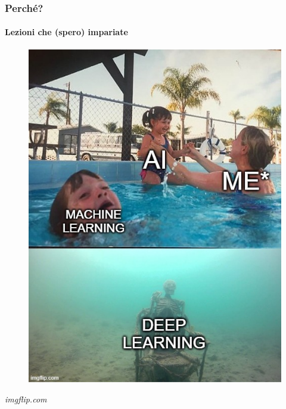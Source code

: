 \begin{frame}[t,fragile] \frametitle{Perché?}
\framesubtitle{Lezioni che (spero) impariate}
{\scriptsize
    \begin{minipage}[b]{\textwidth}
        \begin{minipage}[b]{0.33\textwidth}
            \centering
            \begin{figure}[ht]
                \includegraphics[width=\textwidth]{img/meme-2.jpg}
            \end{figure}
            \begin{flushright}
                \vspace*{-7pt}
                {\tiny\textit{\textcopyright imgflip.com}}
            \end{flushright}
        \end{minipage}
        \begin{minipage}[b]{0.33\textwidth}
            \centering
            \begin{figure}[ht]

\end{figure}
\end{minipage}
\end{minipage}}
\end{frame}
